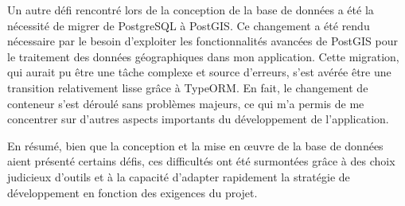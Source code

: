 Un autre défi rencontré lors de la conception de la base de données a été la nécessité de migrer de PostgreSQL à PostGIS.
Ce changement a été rendu nécessaire par le besoin d'exploiter les fonctionnalités avancées de PostGIS pour le traitement des données géographiques dans mon application.
Cette migration, qui aurait pu être une tâche complexe et source d'erreurs, s'est avérée être une transition relativement lisse grâce à TypeORM. En fait,
le changement de conteneur s'est déroulé sans problèmes majeurs, ce qui m'a permis de me concentrer sur d'autres aspects importants du développement de l'application.

En résumé, bien que la conception et la mise en œuvre de la base de données aient présenté certains défis,
ces difficultés ont été surmontées grâce à des choix judicieux d'outils et à la capacité d'adapter rapidement la stratégie
de développement en fonction des exigences du projet.